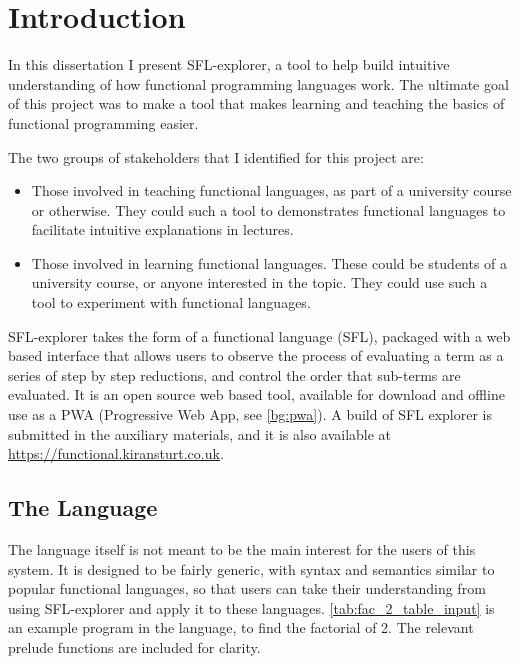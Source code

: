 \chapter{Introduction}
\label{chap:context}
In this dissertation I present SFL-explorer, a tool to help build intuitive understanding of how functional programming languages work. The ultimate goal of this project was to make a tool that makes learning and teaching the basics of functional programming easier. 

The two groups of stakeholders that I identified for this project are:
\begin{itemize}
  \item Those involved in teaching functional languages, as part of a university course or otherwise. They could such a tool to demonstrates functional languages to facilitate intuitive explanations in lectures.
  \item Those involved in learning functional languages. These could be students of a university course, or anyone interested in the topic. They could use such a tool to experiment with functional languages. 
\end{itemize}

SFL-explorer takes the form of a functional language (\ac{SFL}), packaged with a web based interface that allows users to observe the process of evaluating a term as a series of step by step reductions, and control the order that sub-terms are evaluated.  It is an open source web based tool, available for download and offline use as a PWA (Progressive Web App, see \ref{bg:pwa}). A build of SFL explorer is submitted in the auxiliary materials, and it is also available at \href{https://functional.kiransturt.co.uk}{https://functional.kiransturt.co.uk}.

\section{The Language}
The language itself is not meant to be the main interest for the users of this system. It is designed to be fairly generic, with syntax and semantics similar to popular functional languages, so that users can take their understanding from using SFL-explorer and apply it to these languages. \ref{tab:fac_2_table_input} is an example program in the language, to find the factorial of 2. The relevant prelude functions are included for clarity.

